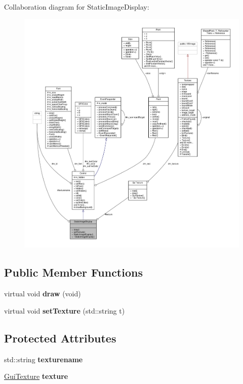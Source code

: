 Collaboration diagram for Static\+Image\+Display\+:
\nopagebreak
\begin{figure}[H]
\begin{center}
\leavevmode
\includegraphics[width=350pt]{dd/df8/classStaticImageDisplay__coll__graph}
\end{center}
\end{figure}
\subsection*{Public Member Functions}
\begin{DoxyCompactItemize}
\item 
virtual void {\bfseries draw} (void)\hypertarget{classStaticImageDisplay_ad666f0cf4d57082e3afc16a571c83aee}{}\label{classStaticImageDisplay_ad666f0cf4d57082e3afc16a571c83aee}

\item 
virtual void {\bfseries set\+Texture} (std\+::string t)\hypertarget{classStaticImageDisplay_af8c8e883f6d741b549fbd2a7f07c076a}{}\label{classStaticImageDisplay_af8c8e883f6d741b549fbd2a7f07c076a}

\end{DoxyCompactItemize}
\subsection*{Protected Attributes}
\begin{DoxyCompactItemize}
\item 
std\+::string {\bfseries texturename}\hypertarget{classStaticImageDisplay_a9e44e5336f6143c780ba16988190d68c}{}\label{classStaticImageDisplay_a9e44e5336f6143c780ba16988190d68c}

\item 
\hyperlink{classGuiTexture}{Gui\+Texture} {\bfseries texture}\hypertarget{classStaticImageDisplay_a7cc1178e5e5eb501e17e282b4c7a2ebf}{}\label{classStaticImageDisplay_a7cc1178e5e5eb501e17e282b4c7a2ebf}

\end{DoxyCompactItemize}

